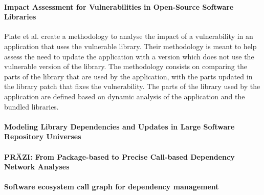 \paragraph{Impact Assessment for Vulnerabilities in Open-Source Software Libraries \cite{plate2015impact}}
Plate et al. create a methodology to analyse the impact of a vulnerability in an application that uses the vulnerable library. Their methodology is meant to help assess the need to update the application with a version which does not use the vulnerable version of the library.
The methodology consists on comparing the parts of the library that are used by the application, with the parts updated in the library patch that fixes the vulnerability. The parts of the library used by the application are defined based on dynamic analysis of the application and the bundled libraries.

\paragraph{Modeling Library Dependencies and Updates in Large Software Repository Universes \cite{Kula2017}}

\paragraph{PRÄZI: From Package-based to Precise Call-based Dependency Network Analyses \cite{hejderup2018prazi}}

\paragraph{Software ecosystem call graph for dependency management \cite{hejderup2018software}}

